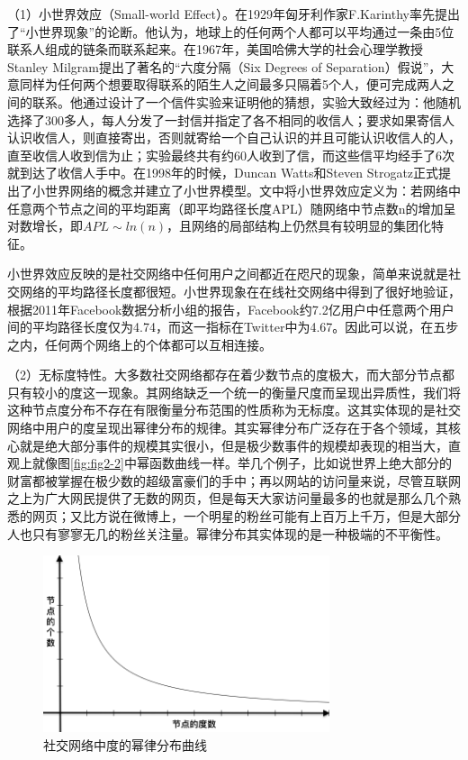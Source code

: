 （1）小世界效应（Small-world Effect）。在1929年匈牙利作家F.Karinthy率先提出了“小世界现象”的论断。他认为，地球上的任何两个人都可以平均通过一条由5位联系人组成的链条而联系起来。在1967年，美国哈佛大学的社会心理学教授Stanley Milgram提出了著名的“六度分隔（Six Degrees of Separation）假说”，大意同样为任何两个想要取得联系的陌生人之间最多只隔着5个人，便可完成两人之间的联系。他通过设计了一个信件实验来证明他的猜想，实验大致经过为：他随机选择了300多人，每人分发了一封信并指定了各不相同的收信人；要求如果寄信人认识收信人，则直接寄出，否则就寄给一个自己认识的并且可能认识收信人的人，直至收信人收到信为止；实验最终共有约60人收到了信，而这些信平均经手了6次就到达了收信人手中。在1998年的时候，Duncan Watts和Steven Strogatz正式提出了小世界网络的概念并建立了小世界模型\cite{Watts1998Collectivedynamics}。文中将小世界效应定义为：若网络中任意两个节点之间的平均距离（即平均路径长度APL）随网络中节点数n的增加呈对数增长，即$APL\sim ln(n)$，且网络的局部结构上仍然具有较明显的集团化特征。

小世界效应反映的是社交网络中任何用户之间都近在咫尺的现象，简单来说就是社交网络的平均路径长度都很短。小世界现象在在线社交网络中得到了很好地验证，根据2011年Facebook数据分析小组的报告，Facebook约7.2亿用户中任意两个用户间的平均路径长度仅为4.74，而这一指标在Twitter中为4.67。因此可以说，在五步之内，任何两个网络上的个体都可以互相连接。

（2）无标度特性。大多数社交网络都存在着少数节点的度极大，而大部分节点都只有较小的度这一现象。其网络缺乏一个统一的衡量尺度而呈现出异质性，我们将这种节点度分布不存在有限衡量分布范围的性质称为无标度。这其实体现的是社交网络中用户的度呈现出幂律分布的规律。其实幂律分布广泛存在于各个领域，其核心就是绝大部分事件的规模其实很小，但是极少数事件的规模却表现的相当大，直观上就像图\ref{fig:fig2-2}中幂函数曲线一样。举几个例子，比如说世界上绝大部分的财富都被掌握在极少数的超级富豪们的手中；再以网站的访问量来说，尽管互联网之上为广大网民提供了无数的网页，但是每天大家访问量最多的也就是那么几个熟悉的网页；又比方说在微博上，一个明星的粉丝可能有上百万上千万，但是大部分人也只有寥寥无几的粉丝关注量。幂律分布其实体现的是一种极端的不平衡性。

\begin{figure}
  \centering
  \includegraphics[width=0.75\textwidth]{figures/fig2-2}
  \caption{社交网络中度的幂律分布曲线}\label{fig2-2}
\end{figure}

